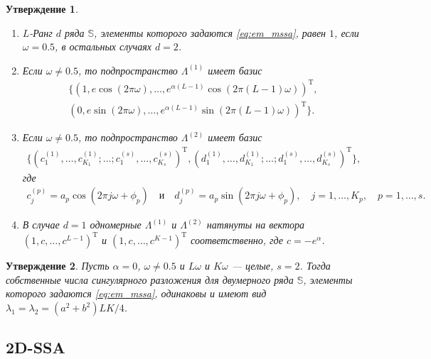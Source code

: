 \documentclass[specialist,
               substylefile = spbu.rtx,
               subf,href,colorlinks=true, 12pt]{disser}
\newtheorem{Th}{Утверждение}
\begin{document}
\begin{Th}  \cite[Предложение 2.2]{Golyandina.etal2003} \label{th:mssa_rank} \label{th:mssa_vec}
\begin{enumerate}
\item 
$L$-Ранг $d$ ряда $\mathbb{S}$, элементы которого задаются \eqref{eq:em_mssa}, равен $1$, если $\omega = 0.5$, в остальных случаях $d=2$.
\item Если $\omega \not = 0.5$, то подпространство $\Lambda^{(1)}$ имеет базис 
\begin{gather*}
\{(1, e\cos(2\pi\omega),\ldots,e^{\alpha (L-1)}\cos(2\pi (L-1) \omega))^\mathrm{T}, \\
(0, e\sin(2\pi\omega),\ldots,e^{\alpha (L-1)}\sin(2\pi (L-1) \omega))^\mathrm{T}\}. 
\end{gather*}
\item Если $\omega \not = 0.5$, то подпространство $\Lambda^{(2)}$ имеет базис 
\begin{gather*}
\{(c^{(1)}_1,\ldots,c_{K_1}^{(1)}; \ldots; c^{(s)}_1,\ldots,c_{K_s}^{(s)})^\mathrm{T},
(d^{(1)}_1,\ldots,d_{K_1}^{(1)}; \ldots; d^{(s)}_1,\ldots,d_{K_s}^{(s)})^\mathrm{T} \}, 
\end{gather*}
где 
\begin{gather*}
c^{(p)}_j = a_p \cos(2\pi j \omega + \phi_p) \quad \text{и}\quad d^{(p)}_j = a_p \sin(2\pi j \omega + \phi_p), \quad j=1,\ldots,K_p, \quad p=1,\ldots,s.
\end{gather*}
\item В случае $d=1$ одномерные $\Lambda^{(1)}$ и $\Lambda^{(2)}$ натянуты на вектора \\ $(1,c,\ldots,c^{L-1})^{\mathrm{T}}$ и $(1,c,\ldots,c^{K-1})^{\mathrm{T}}$ соответственно, где $c = -e^{\alpha}$.
\end{enumerate}
\end{Th}

\begin{Th} \cite[Предложение 2.3]{Golyandina.etal2003} \label{th:mssa_num}
Пусть $\alpha = 0$, $\omega \not = 0.5$ и $L\omega$  и $K\omega$ --- целые, $s=2$. Тогда собственные числа сингулярного разложения для двумерного ряда $\mathbb{S}$, элементы которого задаются \eqref{eq:em_mssa}, одинаковы и имеют вид $\lambda_1=\lambda_2=(a^2 + b^2)LK/4$.
\end{Th}

\subsection{2D-SSA}
\label{sec:2d_ssa_theory}
\end{document}
